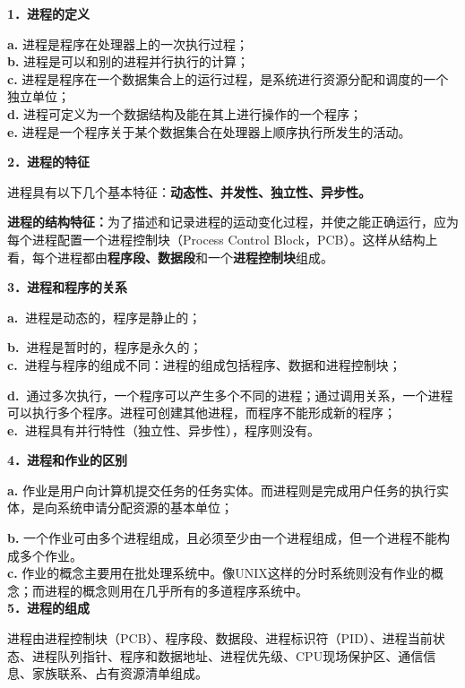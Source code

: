 \textbf{{1．进程的定义}}

\textbf{a.} 进程是程序在处理器上的一次执行过程；\\
\textbf{b.} 进程是可以和别的进程并行执行的计算；\\
\textbf{c.}
进程是程序在一个数据集合上的运行过程，是系统进行资源分配和调度的一个独立单位；\\
\textbf{d.} 进程可定义为一个数据结构及能在其上进行操作的一个程序；\\
\textbf{e.}
进程是一个程序关于某个数据集合在处理器上顺序执行所发生的活动。

\textbf{{2．进程的特征}}

进程具有以下几个基本特征：\textbf{{动态性、}{并发性、}{独立性、}{异步性}。}

\textbf{进程的结构特征：}为了描述和记录进程的运动变化过程，并使之能正确运行，应为每个进程配置一个进程控制块（Process
Control
Block，PCB）。这样从结构上看，每个进程都由\textbf{程序段、数据段}和一个\textbf{进程控制块}组成。

\textbf{{3．进程和程序的关系}}

\textbf{a.~}进程是动态的，程序是静止的；

\textbf{b.~}进程是暂时的，程序是永久的；\\

\textbf{c.~}进程与程序的组成不同：进程的组成包括程序、数据和进程控制块；

\textbf{d.~}通过多次执行，一个程序可以产生多个不同的进程；通过调用关系，一个进程可以执行多个程序。进程可创建其他进程，而程序不能形成新的程序；\\

\textbf{e.~}进程具有并行特性（独立性、异步性），程序则没有。

\textbf{{{4．进程和作业的区别}\\
}}

\textbf{a.}
{作业是用户向计算机提交任务的任务实体。而进程则是完成用户任务的执行实体，是向系统申请分配资源的基本单位；}

\textbf{b.}
一个作业可由多个进程组成，且必须至少由一个进程组成，但一个进程不能构成多个作业。\\
\textbf{c.}
作业的概念主要用在批处理系统中。像UNIX这样的分时系统则没有作业的概念；而进程的概念则用在几乎所有的多道程序系统中。\\

\textbf{{5．进程的组成}}

进程由进程控制块（PCB）、程序段、数据段、进程标识符（PID）、进程当前状态、进程队列指针、程序和数据地址、进程优先级、CPU现场保护区、通信信息、家族联系、占有资源清单组成。
